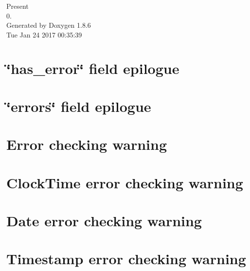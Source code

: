 \documentclass[twoside]{book}
\newcommand{\clearemptydoublepage}{%
  \newpage{\pagestyle{empty}\cleardoublepage}%
}
\begin{document}
\hypersetup{pageanchor=false}
\begin{titlepage}
\vspace*{7cm}
\begin{center}%
{\Large Present \\[1ex]\large 0. }\\
\vspace*{1cm}
{\large Generated by Doxygen 1.8.6}\\
\vspace*{0.5cm}
{\small Tue Jan 24 2017 00:35:39}\\
\end{center}
\end{titlepage}
\clearemptydoublepage
\tableofcontents
\clearemptydoublepage
{}
\hypersetup{pageanchor=true}

\chapter{\char`\"{}has\-\_\-error\char`\"{} field epilogue}
\label{has_error_epilogue}
\hypertarget{has_error_epilogue}{}

\chapter{\char`\"{}errors\char`\"{} field epilogue}
\label{errors_epilogue}
\hypertarget{errors_epilogue}{}

\chapter{Error checking warning}
\label{check_for_error}
\hypertarget{check_for_error}{}

\chapter{Clock\-Time error checking warning}
\label{check_for_error_clocktime}
\hypertarget{check_for_error_clocktime}{}

\chapter{Date error checking warning}
\label{check_for_error_date}
\hypertarget{check_for_error_date}{}

\chapter{Timestamp error checking warning}
\label{check_for_error_timestamp}
\hypertarget{check_for_error_timestamp}{}

\end{document}
